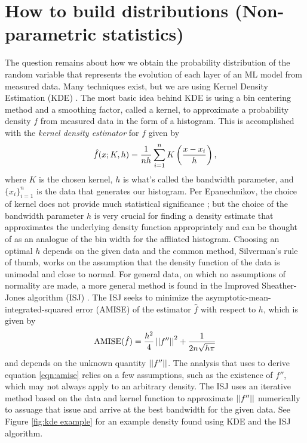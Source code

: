 \section{How to build distributions (Non-parametric statistics)}
The question remains about how we obtain the probability distribution of the random 
variable that represents the evolution of each layer of an ML model from measured data. 
Many techniques exist, but we are using Kernel Density Estimation (KDE) \cite{rosenblatt, parzen}. 
The most 
basic idea behind KDE is using a bin centering method and a smoothing factor, 
called a kernel, to approximate a probability density $f$ from measured data in the form 
of a histogram. This is accomplished with the \emph{kernel density estimator} for $f$
given by
\begin{equation}
    \hat{f}(x; K, h) = \frac{1}{nh}\sum_{i = 1}^n K\left(\frac{x - x_i}{h}\right),
\end{equation}
where $K$ is the chosen kernel, $h$ is what's called the bandwidth parameter, and 
$\{x_i\}_{i=1}^n$ is the data that generates our histogram. Per Epanechnikov, 
the choice of kernel does not provide much statistical significance \cite{epanechnikov}; 
but the choice of the bandwidth parameter $h$ is very crucial for finding a density estimate
that approximates the underlying density function appropriately and can be thought of as an 
analogue of the bin width for the affliated histogram. Choosing an optimal $h$ depends on 
the given data and the common method, Silverman's rule of thumb, works on the 
assumption that the density function of the data is unimodal and close to 
normal. For general data, on which no assumptions of normality are made, a more 
general method is found in the Improved Sheather-Jones algorithm (ISJ) \cite{botev}. 
The ISJ seeks to minimize the asymptotic-mean-integrated-squared error (AMISE) of 
the estimator $\hat{f}$ with respect to $h$, which is given by 
\begin{equation}
    \text{AMISE}(\hat{f}) = \frac{h^2}{4}\left|\left|f''\right|\right|^2 + \frac{1}{2n\sqrt{h\pi}}
    \label{eqn:amise}
\end{equation}
and depends on the unknown quantity $\left|\left|f''\right|\right|$. The analysis that \cite{terrell} uses
to derive equation \ref{eqn:amise} relies on a few assumptions, such as the existence 
of $f''$, which may not always apply to an arbitrary density.
The ISJ uses an 
iterative method based on the data and kernel function to approximate $\left|\left|f''\right|\right|$ 
numerically to assuage that issue and arrive at 
the best bandwidth for the given data. See Figure \ref{fig:kde example} for an example 
density found using KDE and the ISJ algorithm.

